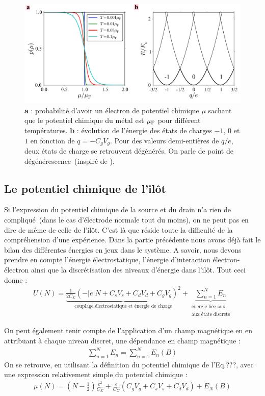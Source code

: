 \begin{figure}
\centering \includegraphics[scale=0.5]{Theorie/Transport/figure2/figure2.pdf} 
\caption{ \textbf{a} : probabilité d'avoir un électron de potentiel chimique $\mu$ sachant que le potentiel chimique du métal est $\mu_{\rm{F}}$ pour différent températures. \textbf{b} : évolution de l'énergie des états de charges $-1$, $0$ et $1$ en fonction de $q = -C_gV_g$. Pour des valeurs demi-entières de $q/e$, deux états de charge se retrouvent dégénérés. On parle de point de dégénérescence~(inspiré de \cite{NazaBook}).}
\label{distrib_fermi}
\end{figure}



\subsection{Le potentiel chimique de l'il\^ot}
Si l'expression du potentiel chimique de la source et du drain n'a rien de compliqué~(dans le cas d'électrode normale tout du moins), on ne peut pas en dire de m\^eme de celle de l'il\^ot. C'est là que réside toute la difficulté de la compréhension d'une expérience. Dans la partie précédente nous avons déjà fait le bilan des différentes énergies en jeux dans le système. A savoir, nous devons prendre en compte l'énergie électrostatique, l'énergie d'interaction électron-électron ainsi que la discrétisation des niveaux d'énergie dans l'il\^ot. Tout ceci donne :
\begin{eqnarray}
U(N) = \underbrace{\frac{1}{2C_{\Sigma}} (-|e|N + C_sV_s + C_dV_d + C_gV_g)^2}_{\text{couplage électrostatique et énergie de charge}}
+ 
\underbrace{\sum_{n=1}^{N} E_n}_{\substack{\text{énergie liée aux} \\\text{aux états discrets}}}
\end{eqnarray}

On peut également tenir compte de l'application d'un champ magnétique en en attribuant à chaque niveau discret, une dépendance en champ magnétique :
\begin{eqnarray}
\sum_{n=1}^N E_n = \sum_{n=1}^N E_n(B) \nonumber
\end{eqnarray}
On se retrouve, en utilisant la définition du potentiel chimique de l'Eq.???, avec une expression relativement simple du potentiel chimique :
\begin{eqnarray}
\mu(N) = (N-\frac{1}{2})\frac{e^2}{C_{\Sigma}}
+ 
\frac{e}{C_{\Sigma}}(C_gV_g + C_sV_s + C_dV_d)
+
E_N(B)
\end{eqnarray}

